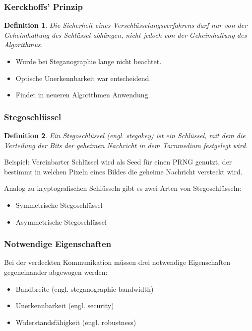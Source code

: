 \documentclass{beamer}
\newtheorem{mydef}{Definition}
\begin{document}
\begin{frame}
    \frametitle{Kerckhoffs' Prinzip}
    \begin{mydef}
      Die Sicherheit eines Verschlüsselungsverfahrens darf nur von der Geheimhaltung des Schlüssel abhängen, nicht jedoch von der Geheimhaltung des Algorithmus.
  \end{mydef}
    \begin{itemize}
      \item Wurde bei Steganographie lange nicht beachtet.
      \item Optische Unerkennbarkeit war entscheidend.
      \item Findet in neueren Algorithmen Anwendung.
    \end{itemize}
\end{frame}

\begin{frame}
    \frametitle{Stegoschlüssel}
    \begin{mydef}
    Ein Stegoschlüssel (engl. stegokey) ist ein Schlüssel, mit dem die Verteilung der Bits der geheimen Nachricht in dem Tarnmedium festgelegt wird.
  \end{mydef}
  Beispiel: Vereinbarter Schlüssel wird als Seed für einen PRNG genutzt, der bestimmt in welchen Pixeln eines Bildes die geheime Nachricht versteckt wird.
\end{frame}

\begin{frame}
  Analog zu kryptografischen Schlüsseln gibt es zwei Arten von Stegoschlüsseln:
  \begin{itemize}
	    \item Symmetrische Stegoschlüssel
	    \item Asymmetrische Stegoschlüssel	    
	  \end{itemize}
\end{frame}

\begin{frame}
\frametitle{Notwendige Eigenschaften}
  Bei der verdeckten Kommunikation müssen drei notwendige Eigenschaften gegeneinander abgewogen werden:
  \begin{itemize}
    \item Bandbreite (engl. steganographic bandwidth)
    \item Unerkennbarkeit (engl. security)
    \item Widerstandsfähigkeit (engl. robustness)
  \end{itemize}
  
\end{frame}
\end{document}
